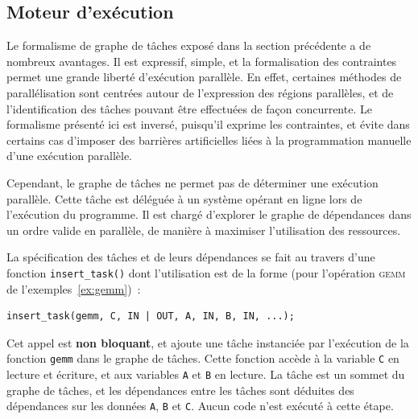\documentclass[11pt]{article}
\theoremstyle{plain} %
\theoremstyle{definition} %
\begin{document}
\subsection{Moteur d'exécution}
\label{sec:runtime}
Le formalisme de graphe de tâches exposé dans la section précédente a de nombreux avantages.
Il est expressif, simple, et la formalisation des contraintes permet une grande liberté d'exécution parallèle.
En effet, certaines méthodes de parallélisation sont centrées autour de l'expression des régions parallèles, et de l'identification des tâches pouvant être effectuées de façon concurrente.
Le formalisme présenté ici est inversé, puisqu'il exprime les contraintes, et évite dans certains cas d'imposer des barrières artificielles liées à la programmation manuelle d'une exécution parallèle.

Cependant, le graphe de tâches ne permet pas de déterminer une exécution parallèle.
Cette tâche est déléguée à un système opérant \og en ligne\fg{} lors de l'exécution du programme.
Il est chargé d'explorer le graphe de dépendances dans un ordre valide en parallèle, de manière à maximiser l'utilisation des ressources.

La spécification des tâches et de leurs dépendances se fait au travers d'une fonction \texttt{insert\_task()} dont l'utilisation est de la forme (pour l'opération \textsc{gemm} de l'exemples~\ref{ex:gemm})~:~
\begin{lstlisting}
insert_task(gemm, C, IN | OUT, A, IN, B, IN, ...);
\end{lstlisting}
Cet appel est \textbf{non bloquant}, et ajoute une tâche instanciée par l'exécution de la fonction \texttt{gemm} dans le graphe de tâches.
Cette fonction accède à la variable \texttt{C} en lecture et écriture, et aux variables \texttt{A} et \texttt{B} en lecture.
La tâche est un sommet du graphe de tâches, et les dépendances entre les tâches sont déduites des dépendances sur les données \texttt{A}, \texttt{B} et \texttt{C}.
Aucun code n'est exécuté à cette étape.
\end{document}
